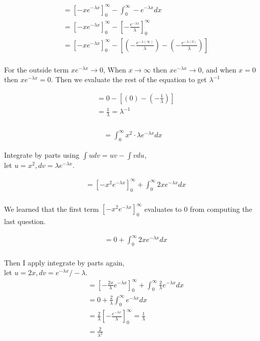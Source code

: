 \documentclass[twocolumn]{article}
\begin{document}
\begin{align*}
	&= [-xe^{-\lambda x}]_{0}^{\infty} - \int_{0}^{\infty} -e^{-\lambda x} dx\\
	&= [-xe^{-\lambda x}]_{0}^{\infty} - [-\frac{e^{-\lambda x}}{\lambda} ]^{\infty}_{0}\\
	&= [-xe^{-\lambda x}]_{0}^{\infty} - [(-\frac{e^{-\lambda (\infty)}}{\lambda} ) - (-\frac{e^{-\lambda (0)}}{\lambda})] \\
\end{align*}

For the outside term $xe^{-\lambda x} \to 0$, When $x \to \infty$ then $xe^{-\lambda x} \to 0$, and when $x = 0$ then $x e^{-\lambda x} = 0$. Then we evaluate the rest of the equation to get $\lambda^{-1}$

\begin{align*}
	&= 0 -[(0) - (-\frac{1}{\lambda})] \\
	&= \frac{1}{\lambda} = \lambda^{-1}\\
\end{align*}

\noindent
\vspace{-5pt}

\vspace{-5pt}
\begin{align*}
	= \int_{0}^{\infty} x^2 \cdot \lambda e^{-\lambda x} dx
\end{align*}

\vspace{-5pt}
Integrate by parts using $\int udv  = uv - \int vdu$, \\let $u = x^2, dv=\lambda e^{-\lambda x}$.

\begin{align*}
    &=[-x^2 e^{-\lambda x}]_{0}^{\infty} + \int_{0}^{\infty} 2x e^{-\lambda x}dx\\
\end{align*}

We learned that the first term $[-x^2 e^{-\lambda x}]_{0}^{\infty}$ evaluates to 0 from computing the last question. 

\begin{align*}
	&=0 +\int_{0}^{\infty}2x e^{-\lambda x}dx\\
\end{align*}

Then I apply integrate by parts again, \\let $u = 2x, dv=e^{-\lambda x} /-\lambda$.
\begin{align*}
	&=[ -\frac{2x}{\lambda} e^{-\lambda x} ]_{0}^{\infty} + \int_{0}^{\infty} \frac{2}{\lambda} e^{-\lambda x}dx\\
	&=0 + \frac{2}{\lambda} \int_{0}^{\infty}  e^{-\lambda x}dx\\
	&= \frac{2}{\lambda} [ -\frac{e^{-\lambda x}}{\lambda} ]_{0}^{\infty} = \frac{1}{\lambda}\\
	&= \frac{2}{\lambda^2} 
\end{align*}
\end{document}
